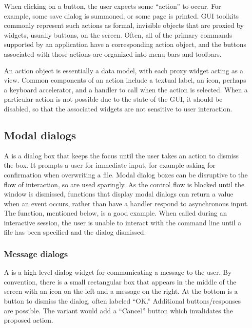When clicking on a button, the user expects some ``action'' to
occur. For example, some save dialog is summoned, or some page is
printed.  GUI toolkits commonly represent such actions as formal,
invisible objects that are proxied by widgets, usually buttons, on the
screen.  Often, all of the primary commands supported by an
application have a corresponding action object, and the buttons
associated with those actions are organized into menu bars and
toolbars.

An action object is essentially a data model, with each proxy widget
acting as a view. Common components of an action include a textual
label, an icon, perhaps a keyboard accelerator, and a handler to call
when the action is selected. When a particular action is not possible
due to the state of the GUI, it should be disabled, so that the
associated widgets are not sensitive to user interaction.


\subsection{Modal dialogs}
\label{sec:GUI:modal-dialogs}

A  is a dialog box that keeps the focus until
the user takes an action to dismiss the box. It prompts a user for
immediate input, for example asking for confirmation when overwriting
a file. Modal dialog boxes can be disruptive to the flow of
interaction, so are used sparingly. As the control flow is
blocked until the window is dismissed, functions that display modal
dialogs can return a value when an event occurs, rather than have a
handler respond to asynchronous input. The 
function, mentioned below, is a good example. When called during an
interactive \R\/ session, the user is unable to interact with the
command line until a file has been specified and the dialog dismissed.

\subsubsection{Message dialogs}
\label{sec:GUI:message-dialogs}

A  is a high-level dialog widget for
communicating a message to the user. By convention, there is a small
rectangular box that appears in the middle of the screen with an icon
on the left and a message on the right. At the bottom is a button to
dismiss the dialog, often labeled ``OK.''  Additional
buttons/responses are possible. The 
variant would add a ``Cancel'' button which invalidates the proposed
action.

